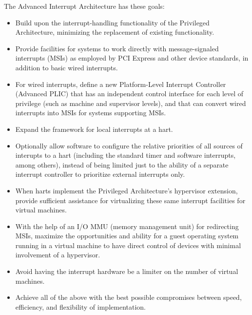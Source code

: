 The {\RISCV} Advanced Interrupt Architecture has these goals:
\begin{itemize}

\item
Build upon the interrupt-handling functionality of the {\RISCV}
Privileged Architecture, minimizing the replacement of existing
functionality.

\item
Provide facilities for {\RISCV} systems to work directly with
message-signaled interrupts (MSIs) as employed by PCI Express and other
device standards, in addition to basic wired interrupts.

\item
For wired interrupts, define a new Platform-Level Interrupt Controller
(Advanced PLIC) that has an independent control interface for each
level of privilege (such as {\RISCV} machine and supervisor levels),
and that can convert wired interrupts into MSIs for systems supporting
MSIs.

\item
Expand the framework for local interrupts at a {\RISCV} hart.

\item
Optionally allow software to configure the relative priorities of all
sources of interupts to a {\RISCV} hart (including the standard timer
and software interrupts, among others), instead of being limited
just to the ability of a separate interrupt controller to prioritize
external interrupts only.

\item
When harts implement the Privileged Architecture's hypervisor
extension, provide sufficient assistance for virtualizing these same
interrupt facilities for virtual machines.

\item
With the help of an I/O MMU (memory management unit) for redirecting
MSIs, maximize the opportunities and ability for a guest operating
system running in a virtual machine to have direct control of devices
with minimal involvement of a hypervisor.

\item
Avoid having the interrupt hardware be a limiter on the number of
virtual machines.

\item
Achieve all of the above with the best possible compromises between
speed, efficiency, and flexibility of implementation.

\end{itemize}

